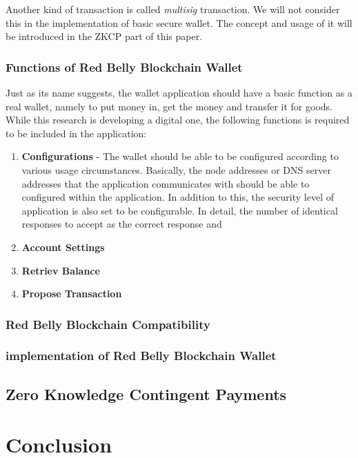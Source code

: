 \documentclass[12pt]{article}
\begin{document}
Another kind of transaction is called \textit{multisig} transaction. We will not consider this in the implementation of basic secure wallet. The concept and usage of it will be introduced in the ZKCP part of this paper.

\subsubsection{Functions of Red Belly Blockchain Wallet}

Just as its name suggests, the wallet application should have a basic function as a real wallet, namely to put money in, get the money and transfer it for goods. While this research is developing a digital one, the following functions is required to be included in the application:

\begin{enumerate}
   \item \textbf{Configurations} - The wallet should be able to be configured according to various usage circumstances. Basically, the node addresses or DNS server addresses that the application communicates with should be able to configured within the application. In addition to this, the security level of application is also set to be configurable. In detail, the number of identical responses to accept as the correct response and  
   \item \textbf{Account Settings}
   \item \textbf{Retriev Balance}
   \item \textbf{Propose Transaction}
\end{enumerate}

\subsubsection{Red Belly Blockchain Compatibility}

\subsubsection{implementation of Red Belly Blockchain Wallet}


\subsection{Zero Knowledge Contingent Payments}


\section{Conclusion}
\end{document}
